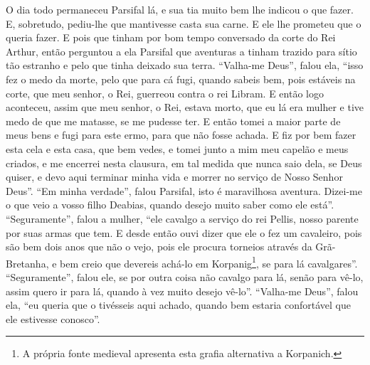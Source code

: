 O dia todo permaneceu Parsifal lá, e sua tia muito bem lhe indicou o que
fazer. E, sobretudo, pediu-lhe que mantivesse casta sua carne. E ele lhe
prometeu que o queria fazer. E pois que tinham por bom tempo conversado da
corte do Rei Arthur, então perguntou a ela Parsifal que aventuras a tinham
trazido para sítio tão estranho e pelo que tinha deixado sua terra. “Valha-me
Deus”, falou ela, “isso fez o medo da morte, pelo que para cá fugi, quando
sabeis bem, pois estáveis na corte, que meu senhor, o Rei, guerreou contra o
rei Libram. E então logo aconteceu, assim que meu senhor, o Rei, estava morto,
que eu lá era mulher e tive medo de que me matasse, se me pudesse ter. E então
tomei a maior parte de meus bens e fugi para este ermo, para que não fosse
achada. E fiz por bem fazer esta cela e esta casa, que bem vedes, e tomei junto
a mim meu capelão e meus criados, e me encerrei nesta clausura, em tal medida
que nunca saio dela, se Deus quiser, e devo aqui terminar minha vida e morrer
no serviço de Nosso Senhor Deus”. “Em minha verdade”, falou Parsifal, isto é
maravilhosa aventura. Dizei-me o que veio a vosso filho Deabias, quando desejo
muito saber como ele está”. “Seguramente”, falou a mulher, “ele cavalgo a
serviço do rei Pellis, nosso parente por suas armas que tem. E desde então ouvi
dizer que ele o fez um cavaleiro, pois são bem dois anos que não o vejo, pois
ele procura torneios através da Grã-Bretanha, e bem creio que devereis achá-lo
em Korpanig\footnote{ A própria fonte medieval apresenta esta grafia
alternativa a Korpanich.},  se para lá cavalgares”. “Seguramente”,
falou ele, se por outra coisa não cavalgo para lá, senão para vê-lo, assim
quero ir para lá, quando à vez muito desejo vê-lo”. “Valha-me Deus”, falou ela,
“eu queria que o tivésseis aqui achado, quando bem estaria confortável que ele
estivesse conosco”. 

